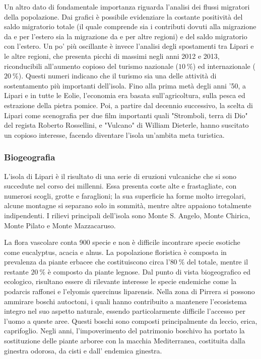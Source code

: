 \documentclass[fleqn,11pt]{SelfArx} %
\begin{document}
Un altro dato di fondamentale importanza riguarda l'analisi dei flussi migratori della popolazione. 
Dai grafici è possibile evidenziare la costante positività del saldo migratorio totale (il quale comprende sia i contributi dovuti alla migrazione da e per l'estero sia la migrazione da e per altre regioni) e del saldo migratorio con l'estero. 
Un po' più oscillante è invece l'analisi degli spostamenti tra Lipari e le altre regioni, che presenta picchi di massimi negli anni 2012 e 2013, riconducibili all'aumento copioso del turismo nazionale (\(\SI{+10}{\percent}\)) ed internazionale (\(\SI{+20}{\percent}\)). 
Questi numeri indicano che il turismo sia una delle attività di sostentamento più importanti dell'isola. 
Fino alla prima metà degli anni '50, a Lipari e in tutte le Eolie, l'economia era basata sull'agricoltura, sulla pesca ed estrazione della pietra pomice. 
Poi, a partire dal decennio successivo, la scelta di Lipari come scenografia per due film importanti quali "Stromboli, terra di Dio" del regista Roberto Rossellini, e "Vulcano" di William Dieterle, hanno suscitato un copioso interesse, facendo diventare l'isola un'ambita meta turistica.

\subsubsection{Biogeografia}
L'isola di Lipari è il risultato di una serie di eruzioni vulcaniche che si sono succedute nel corso dei millenni. Essa presenta coste alte e frastagliate, con numerosi scogli, grotte e faraglioni; la sua superficie ha forme molto irregolari, alcune montagne si separano solo in sommità, mentre altre appaiono totalmente indipendenti. I rilievi principali dell'isola sono Monte S. Angelo, Monte Chirica, Monte Pilato e Monte Mazzacaruso.

La flora vascolare conta 900 specie e non è difficile incontrare specie esotiche come eucalyptus, acacia e alnus. La popolazione floristica è composta in prevalenza da piante erbacee che costituiscono circa l'\(\SI{80}{\percent}\) del totale, mentre il restante \(\SI{20}{\percent}\) è composto da piante legnose. Dal punto di vista biogeografico ed ecologico, risultano essere di rilevante interesse le specie endemiche come la podarcis raffonei e l'elyomis quercinus liparensis. Nella zona di Pirrera si possono ammirare boschi autoctoni, i quali hanno contribuito a mantenere l'ecosistema integro nel suo aspetto naturale, essendo particolarmente difficile l'accesso per l'uomo a queste aree. Questi boschi sono composti principalmente da leccio, erica, caprifoglio. Negli anni, l'impoverimento del patrimonio boschivo ha portato la sostituzione delle piante arboree con la macchia Mediterranea, costituita dalla ginestra odorosa, da cisti e dall' endemica ginestra.
\end{document}
